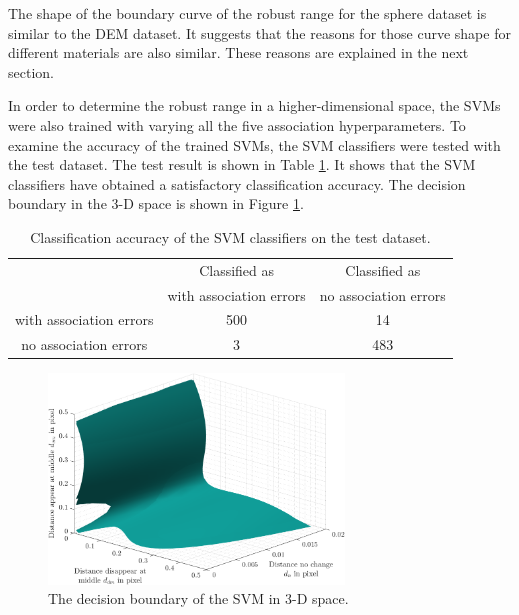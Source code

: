 The shape of the boundary curve of the robust range for the sphere dataset is similar to the DEM dataset. It suggests that the reasons for those curve shape for different materials are also similar. These reasons are explained in the next section.

In order to determine the robust range in a higher-dimensional space, the SVMs were also trained with varying all the five association hyperparameters. To examine the accuracy of the trained SVMs, the SVM classifiers were tested with the test dataset. The test result is shown in Table \ref{svm test}. It shows that the SVM classifiers have obtained a satisfactory classification accuracy. The decision boundary in the 3-D space is shown in Figure \ref{3d svm}.


\begin{table}[htb] 
    \centering
    \caption{Classification accuracy of the SVM classifiers on the test dataset.} 
    \begin{tabular}{ccc} 
    \toprule 
     & Classified as & Classified as\\ 
     & with association errors & no association errors\\
    \midrule 
    with association errors & 500 &14 \\
    no association errors   & 3  &483 \\
    \bottomrule 
    \end{tabular} 
    \label{svm test}
\end{table}



\begin{figure}[htbp]
\centering
\includegraphics[width=0.7\textwidth]{figures/Asso/3d svm.png}
\caption{The decision boundary of the SVM in 3-D space.}
\label{3d svm}
\end{figure}


\FloatBarrier

